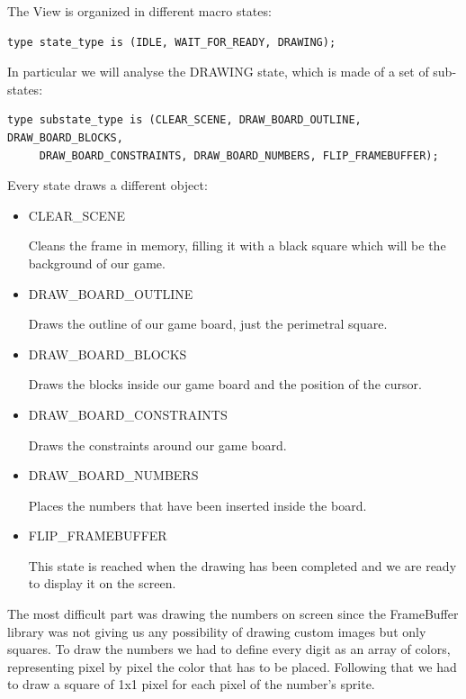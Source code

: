 \documentclass[12pt]{report}
\begin{document}
\newpage

The View is organized in different macro states:

\begin{verbatim}
type state_type is (IDLE, WAIT_FOR_READY, DRAWING);
\end{verbatim}

In particular we will analyse the DRAWING state, which is made of a set of
sub-states:

\begin{verbatim}
type substate_type is (CLEAR_SCENE, DRAW_BOARD_OUTLINE, DRAW_BOARD_BLOCKS,
     DRAW_BOARD_CONSTRAINTS, DRAW_BOARD_NUMBERS, FLIP_FRAMEBUFFER);
\end{verbatim}

Every state draws a different object:

\begin{itemize}
  \item CLEAR\_SCENE

  Cleans the frame in memory, filling it with a black square which will be
  the background of our game.

  \item DRAW\_BOARD\_OUTLINE

  Draws the outline of our game board, just the perimetral square.

  \item DRAW\_BOARD\_BLOCKS

  Draws the blocks inside our game board and the position of the cursor.

  \item DRAW\_BOARD\_CONSTRAINTS

  Draws the constraints around our game board.

  \item DRAW\_BOARD\_NUMBERS

  Places the numbers that have been inserted inside the board.

  \item FLIP\_FRAMEBUFFER

  This state is reached when the drawing has been completed and we are
  ready to display it on the screen.
\end{itemize}

The most difficult part was drawing the numbers on screen since the
FrameBuffer library was not giving us any possibility of drawing custom
images but only squares. To draw the numbers we had to define every digit
as an array of colors, representing pixel by pixel the color that has to
be placed. Following that we had to draw a square of 1x1 pixel for each
pixel of the number's sprite.
\end{document}
